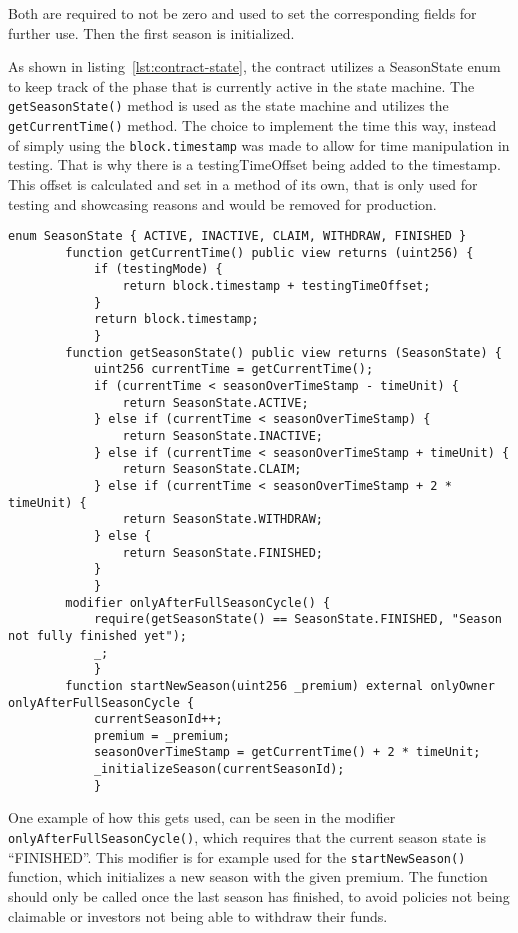 \documentclass[11pt,a4paper]{article}
\begin{document}
		Both are required to not be zero and used to set the corresponding fields for further use.
		Then the first season is initialized.

        \bigskip

		As shown in listing~\ref{lst:contract-state}, the contract utilizes a SeasonState enum to keep track of the phase that is currently active in the state machine.
		The \texttt{getSeasonState()} method is used as the state machine and utilizes the \texttt{getCurrentTime()} method.
		The choice to implement the time this way, instead of simply using the \texttt{block.timestamp} was made to allow for time manipulation in testing.
		That is why there is a testingTimeOffset being added to the timestamp.
		This offset is calculated and set in a method of its own, that is only used for testing and showcasing reasons and would be removed for production.

		\begin{lstlisting}[style=soliditystyle, caption={Excerpt: RainyDayFund.sol - StateMachine},label={lst:contract-state}]
		enum SeasonState { ACTIVE, INACTIVE, CLAIM, WITHDRAW, FINISHED }
		function getCurrentTime() public view returns (uint256) {
			if (testingMode) {
				return block.timestamp + testingTimeOffset;
			}
			return block.timestamp;
			}
        function getSeasonState() public view returns (SeasonState) {
            uint256 currentTime = getCurrentTime();
            if (currentTime < seasonOverTimeStamp - timeUnit) {
                return SeasonState.ACTIVE;
            } else if (currentTime < seasonOverTimeStamp) {
                return SeasonState.INACTIVE;
            } else if (currentTime < seasonOverTimeStamp + timeUnit) {
                return SeasonState.CLAIM;
            } else if (currentTime < seasonOverTimeStamp + 2 * timeUnit) {
                return SeasonState.WITHDRAW;
            } else {
                return SeasonState.FINISHED;
            }
            }
        modifier onlyAfterFullSeasonCycle() {
            require(getSeasonState() == SeasonState.FINISHED, "Season not fully finished yet");
            _;
            }
        function startNewSeason(uint256 _premium) external onlyOwner onlyAfterFullSeasonCycle {
            currentSeasonId++;
            premium = _premium;
            seasonOverTimeStamp = getCurrentTime() + 2 * timeUnit;
            _initializeSeason(currentSeasonId);
            }
		\end{lstlisting}

		One example of how this gets used, can be seen in the modifier \texttt{onlyAfterFullSeasonCycle()}, which requires that the current season state is \enquote{FINISHED}.
		This modifier is for example used for the \texttt{startNewSeason()} function, which initializes a new season with the given premium.
		The function should only be called once the last season has finished, to avoid policies not being claimable or investors not being able to withdraw their funds.
\end{document}
